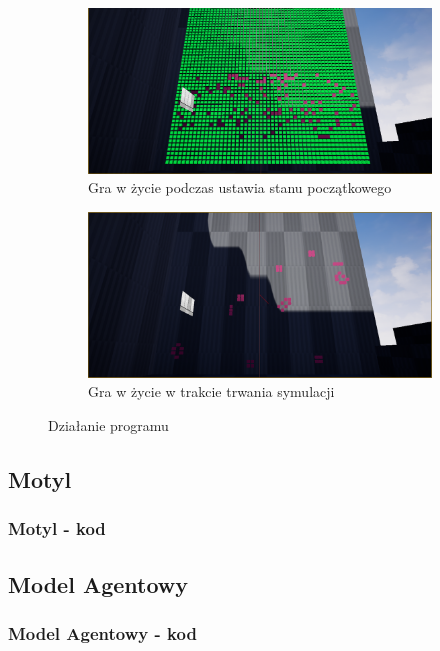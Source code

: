 \documentclass[a4paper,12pt,reqno]{article}
\begin{document}
\begin{figure}[H]%
	\centering
	\begin{subfigure}{.5\textwidth}
		\centering
		\includegraphics[width=0.8\linewidth]{graphics/GOLInUE_1.png}
		\caption{Gra w życie podczas ustawia stanu początkowego}	
		\label{ref:subref_a}
	\end{subfigure}%
	\begin{subfigure}{.5\textwidth}
		\centering
		\includegraphics[width=0.8\linewidth]{graphics/GOLInUE_2.png}
		\caption{Gra w życie w trakcie trwania symulacji}
		\label{ref:subref_b}
	\end{subfigure}%
	

\caption{Działanie programu}
\label{ref:ref}
\end{figure}

\subsection{Motyl}
\subsubsection{Motyl - kod}
\subsection{Model Agentowy}
\subsubsection{Model Agentowy - kod}
\end{document}
